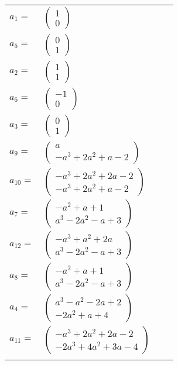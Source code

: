 \documentclass[1p]{elsarticle_modified}
\theoremstyle{definition}
\begin{document}
\begin{tabular}{m{7pt} m{180pt} m{7pt} m{180pt} }
\flushright $a_{1}=$&$\begin{pmatrix}1\\0\end{pmatrix}$ \\
\flushright $a_{5}=$&$\begin{pmatrix}0\\1\end{pmatrix}$ \\
\flushright $a_{2}=$&$\begin{pmatrix}1\\1\end{pmatrix}$ \\
\flushright $a_{6}=$&$\begin{pmatrix}-1\\0\end{pmatrix}$ \\
\flushright $a_{3}=$&$\begin{pmatrix}0\\1\end{pmatrix}$ \\
\flushright $a_{9}=$&$\begin{pmatrix}a\\- a^3+2 a^2+a-2\end{pmatrix}$ \\
\flushright $a_{10}=$&$\begin{pmatrix}- a^3+2 a^2+2 a-2\\- a^3+2 a^2+a-2\end{pmatrix}$ \\
\flushright $a_{7}=$&$\begin{pmatrix}- a^2+a+1\\a^3-2 a^2- a+3\end{pmatrix}$ \\
\flushright $a_{12}=$&$\begin{pmatrix}- a^3+a^2+2 a\\a^3-2 a^2- a+3\end{pmatrix}$ \\
\flushright $a_{8}=$&$\begin{pmatrix}- a^2+a+1\\a^3-2 a^2- a+3\end{pmatrix}$ \\
\flushright $a_{4}=$&$\begin{pmatrix}a^3- a^2-2 a+2\\-2 a^2+a+4\end{pmatrix}$ \\
\flushright $a_{11}=$&$\begin{pmatrix}- a^3+2 a^2+2 a-2\\-2 a^3+4 a^2+3 a-4\end{pmatrix}$\\&\end{tabular}
\end{document}
